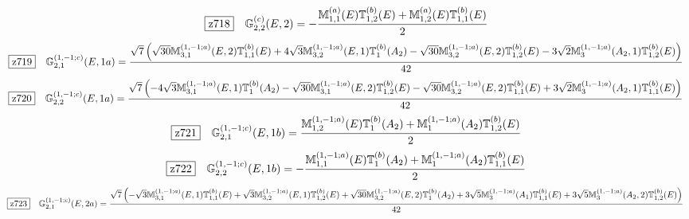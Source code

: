 \documentclass[fleqn,10pt,landscape]{jsarticle}
\begin{document}
\begin{dmath*}
\hspace*{3mm}\fbox{z718}\quad \mathbb{G}_{2,2}^{(c)}(E,2)=- \frac{\mathbb{M}_{1,1}^{(a)}(E) \mathbb{T}_{1,2}^{(b)}(E) + \mathbb{M}_{1,2}^{(a)}(E) \mathbb{T}_{1,1}^{(b)}(E)}{2}
\end{dmath*}
\begin{dmath*}
\hspace*{3mm}\fbox{z719}\quad \mathbb{G}_{2,1}^{(1,-1;c)}(E,1a)=\frac{\sqrt{7} \left(\sqrt{30} \mathbb{M}_{3,1}^{(1,-1;a)}(E,2) \mathbb{T}_{1,1}^{(b)}(E) + 4 \sqrt{3} \mathbb{M}_{3,2}^{(1,-1;a)}(E,1) \mathbb{T}_{1}^{(b)}(A_{2}) - \sqrt{30} \mathbb{M}_{3,2}^{(1,-1;a)}(E,2) \mathbb{T}_{1,2}^{(b)}(E) - 3 \sqrt{2} \mathbb{M}_{3}^{(1,-1;a)}(A_{2},1) \mathbb{T}_{1,2}^{(b)}(E)\right)}{42}
\end{dmath*}
\begin{dmath*}
\hspace*{3mm}\fbox{z720}\quad \mathbb{G}_{2,2}^{(1,-1;c)}(E,1a)=\frac{\sqrt{7} \left(- 4 \sqrt{3} \mathbb{M}_{3,1}^{(1,-1;a)}(E,1) \mathbb{T}_{1}^{(b)}(A_{2}) - \sqrt{30} \mathbb{M}_{3,1}^{(1,-1;a)}(E,2) \mathbb{T}_{1,2}^{(b)}(E) - \sqrt{30} \mathbb{M}_{3,2}^{(1,-1;a)}(E,2) \mathbb{T}_{1,1}^{(b)}(E) + 3 \sqrt{2} \mathbb{M}_{3}^{(1,-1;a)}(A_{2},1) \mathbb{T}_{1,1}^{(b)}(E)\right)}{42}
\end{dmath*}
\begin{dmath*}
\hspace*{3mm}\fbox{z721}\quad \mathbb{G}_{2,1}^{(1,-1;c)}(E,1b)=\frac{\mathbb{M}_{1,2}^{(1,-1;a)}(E) \mathbb{T}_{1}^{(b)}(A_{2}) + \mathbb{M}_{1}^{(1,-1;a)}(A_{2}) \mathbb{T}_{1,2}^{(b)}(E)}{2}
\end{dmath*}
\begin{dmath*}
\hspace*{3mm}\fbox{z722}\quad \mathbb{G}_{2,2}^{(1,-1;c)}(E,1b)=- \frac{\mathbb{M}_{1,1}^{(1,-1;a)}(E) \mathbb{T}_{1}^{(b)}(A_{2}) + \mathbb{M}_{1}^{(1,-1;a)}(A_{2}) \mathbb{T}_{1,1}^{(b)}(E)}{2}
\end{dmath*}
\begin{dmath*}
\hspace*{3mm}\fbox{z723}\quad \mathbb{G}_{2,1}^{(1,-1;c)}(E,2a)=\frac{\sqrt{7} \left(- \sqrt{3} \mathbb{M}_{3,1}^{(1,-1;a)}(E,1) \mathbb{T}_{1,1}^{(b)}(E) + \sqrt{3} \mathbb{M}_{3,2}^{(1,-1;a)}(E,1) \mathbb{T}_{1,2}^{(b)}(E) + \sqrt{30} \mathbb{M}_{3,2}^{(1,-1;a)}(E,2) \mathbb{T}_{1}^{(b)}(A_{2}) + 3 \sqrt{5} \mathbb{M}_{3}^{(1,-1;a)}(A_{1}) \mathbb{T}_{1,1}^{(b)}(E) + 3 \sqrt{5} \mathbb{M}_{3}^{(1,-1;a)}(A_{2},2) \mathbb{T}_{1,2}^{(b)}(E)\right)}{42}
\end{dmath*}
\end{document}
